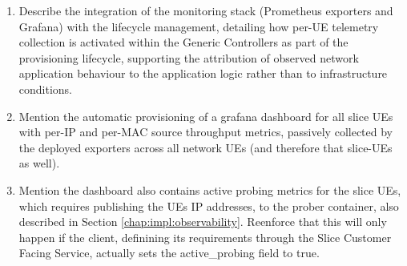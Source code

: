 {\begin{enumerate}
    \item Describe the integration of the monitoring stack (Prometheus exporters and Grafana) with the lifecycle management, detailing how per-UE telemetry collection is activated within the Generic Controllers as part of the provisioning lifecycle, supporting the attribution of observed network application behaviour to the application logic rather than to infrastructure conditions.
    \item Mention the automatic provisioning of a grafana dashboard for all slice UEs with per-IP and per-MAC source throughput metrics, passively collected by the deployed exporters across all network UEs (and therefore that slice-UEs as well).
    \item Mention the dashboard also contains active probing metrics for the slice UEs, which requires publishing the UEs IP addresses, to the prober container, also described in Section \ref{chap:impl:observability}. Reenforce that this will only happen if the client, definining its requirements through the Slice Customer Facing Service, actually sets the active\_probing field to true. 
\end{enumerate}}
